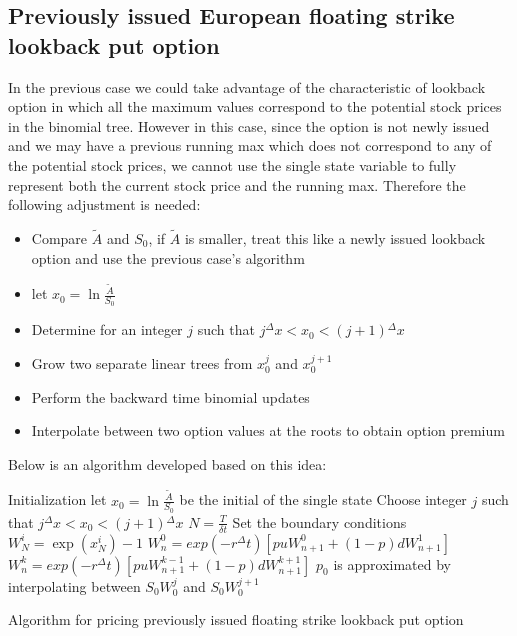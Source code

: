 \subsection{Previously issued European floating strike lookback put option}
In the previous case we could take advantage of the characteristic of lookback option in which all the maximum values correspond to the potential stock prices in the binomial tree. However in this case, since the option is not newly issued and we may have a previous running max which does not correspond to any of the potential stock prices, we cannot use the single state variable to fully represent both the current stock price and the running max. Therefore the following adjustment is needed:
\begin{itemize}
	\item Compare $\tilde{A}$ and $S_{0}$, if $\tilde{A}$ is smaller, treat this like a newly issued lookback option and use the previous case's algorithm
	\item let $x_{0} = \ln \frac{\tilde{A}}{S_{0}}$
	\item Determine for an integer $j$ such that $j{^{\Delta}x} < x_{0} < (j+1){^{\Delta}x}$
	\item Grow two separate linear trees from $x_{0}^{j}$ and $x_{0}^{j+1}$
	\item Perform the backward time binomial updates
	\item Interpolate between two option values at the roots to obtain option premium
\end{itemize}
Below is an algorithm developed based on this idea:\\
\begin{algorithm}[H]
 Initialization\;
 let $x_{0} = \ln \frac{\tilde{A}}{S_{0}}$ be the initial  of the single state\;
 Choose integer $j$ such that $j{^{\Delta}x} < x_{0} < (j+1){^{\Delta}x}$\;
 $N = \frac{T}{\delta t}$\;
 Set the boundary conditions\;
  {
  $W_{N}^{i} = \exp(x_{N}^{i}) - 1$\;
 }
  {
   {
    $W_{n}^{0} = exp(-r{^{\Delta}t})[puW_{n+1}^{0}+(1-p)dW_{n+1}^{1}]$\;
  }
   {
    $W_{n}^{k} = exp(-r{^{\Delta}t})[puW_{n+1}^{k-1}+(1-p)dW_{n+1}^{k+1}]$\;
  }
 }
 $p_{0}$ is approximated by interpolating between $S_{0}W_{0}^{j}$ and $S_{0}W_{0}^{j+1}$\;
\caption{Algorithm for pricing previously issued floating strike lookback put option}
\end{algorithm}
\newpage

